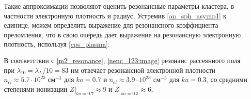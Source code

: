 
Такие аппроксимации позволяют оценить резонансные параметры кластера, в частности электронную плотность и радиус. Устремив \autoref{an_sph_asymp1} к единице, можем определить выражение для резонансного коэффициента преломления, что в свою очередь дает выражение на резонансную электронную плотность, используя \autoref{eps_plasma}:




В соответствии с \autoref{m2_resonance}, \autoref{nenc_123:image} резонанс рассеянного поля при $\lambda_{10} = \lambda_{L} / 10 = 83$ нм отвечает резонансной электронной плотности $n_{el} \approx 5.7 \cdot 10^{23}$ $\textrm{см}^{-3}$ для $ka = 0.7$ и $n_{el} \approx 3.9 \cdot 10^{23}$ $\textrm{см}^{-3}$ для $ka = 0.3$, со средними степенями ионизации $Z|_{ka = 0.7} \approx 9$ и $Z|_{ka = 0.3} \approx 6$.


